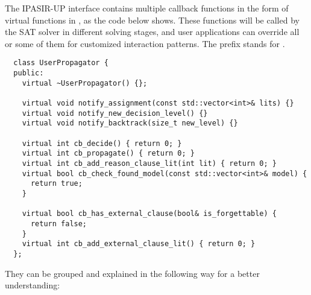The IPASIR-UP interface contains multiple callback functions in the form of virtual functions in , as the code below shows. These functions will be called by the SAT solver in different solving stages, and user applications can override all or some of them for customized interaction patterns. The  prefix stands for .

\begin{lstlisting}
  class UserPropagator {
  public:
    virtual ~UserPropagator() {};

    virtual void notify_assignment(const std::vector<int>& lits) {}
    virtual void notify_new_decision_level() {}
    virtual void notify_backtrack(size_t new_level) {}

    virtual int cb_decide() { return 0; }
    virtual int cb_propagate() { return 0; }
    virtual int cb_add_reason_clause_lit(int lit) { return 0; }
    virtual bool cb_check_found_model(const std::vector<int>& model) {
      return true;
    }

    virtual bool cb_has_external_clause(bool& is_forgettable) {
      return false;
    }
    virtual int cb_add_external_clause_lit() { return 0; }
  };
\end{lstlisting}

They can be grouped and explained in the following way for a better understanding:

